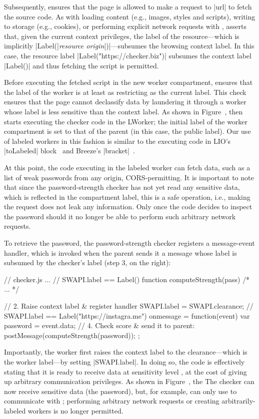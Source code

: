 Subsequently, \sys{} ensures that the page is allowed to make
a request to \js|url| to fetch the source code.
%
As with loading content (e.g., images, styles and scripts), writing to
storage (e.g., cookies), or performing explicit network requests with
\xhr{}, \sys{} asserts that, given the current context privileges, the
label of the resource---which is implicitly \js|Label(|\emph{resource
origin}\js|)|---subsumes the browsing context label.
%
In this case, the resource label \js|Label("https://checker.biz")|
subsumes the context label \js|Label()| and thus fetching the script
is permitted.

Before executing the fetched script in the new worker compartment, \sys{}
ensures that the label of the worker is at least as restricting as the
current label.
%
This check ensures that the page cannot declassify data by laundering
it through a worker whose label is less sensitive than the context
label.
%
\iffigures
\ifcompletefigures
As shown in Figure~, 
\fi
\fi
\sys{} then starts
executing the checker code in the LWorker; the initial label of the
worker compartment is set to that of the parent (in this case, the
public label).
%
Our use of labeled workers in this fashion is similar to the executing code in
LIO's \js|toLabeled| block~\cite{stefan:2011:flexible} and Breeze's
\js|bracket|~\cite{Breeze13}.
 
At this point, the code executing in the labeled worker can fetch
data, such as a list of weak passwords from any origin,
CORS-permitting.
%
It is important to note that since the password-strength checker has
not yet read any sensitive data, which is reflected in the compartment
label, this is a safe operation, i.e., making the request does not
leak any information.
%
Only once the code decides to inspect the password should it no
longer be able to perform such arbitrary network requests.

To retrieve the password, the password-strength checker registers a
message-event handler, which is invoked when the parent sends it a
message whose label is subsumed by the checker's label (step 3, on the
right):
\begin{jscode}
// checker.js ...
// SWAPI.label == Label()
function computeStrength(pass) { /* ... */ }

// 2. Raise context label & register handler
SWAPI.label = SWAPI.clearance;
// SWAPI.label == Label("https://instagra.me")
onmessage = function(event) {
  var password = event.data;
  // 4. Check score & send it to parent:
  postMessage(computeStrength(password));
};
\end{jscode}
%
Importantly, the worker first raises the context label to the
clearance---which is the worker label---by setting \js|SWAPI.label|.
%
In doing so, the code is effectively stating that it is ready to
receive data at sensitivity level , at the cost of
giving up arbitrary communication privileges.
%
\iffigures
\ifcompletefigures
As shown in Figure~, the 
\else
The
\fi
\fi
checker can now receive
sensitive data (the password), but, for example, can only use \xhr{} to
communicate with ;
%
performing arbitrary network requests or creating arbitrarily-labeled
workers is no longer permitted.


